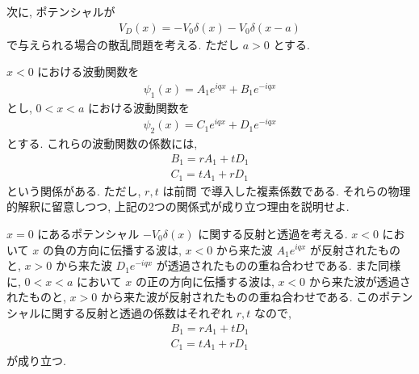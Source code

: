 \documentclass[../../ou-physics-exam.tex]{subfiles}
\begin{document}
次に, ポテンシャルが
\begin{align*}
    V_D (x) = - V_0 \delta (x) - V_0 \delta (x - a)
\end{align*}
で与えられる場合の散乱問題を考える. 
ただし $ a > 0 $ とする.

$ x < 0 $ における波動関数を
\begin{align*}
    \psi_1 (x) = A_1 e^{iqx} + B_1 e^{-iqx}
\end{align*}
とし, $ 0 < x < a $ における波動関数を
\begin{align*}
    \psi_2 (x) = C_1 e^{iqx} + D_1 e^{-iqx}
\end{align*}
とする. 
これらの波動関数の係数には,
\begin{align*}
    B_1 = rA_1 + tD_1 \\
    C_1 = tA_1 + rD_1
\end{align*}
という関係がある. 
ただし, $ r, t $ は前問 \setcounter{prob}{1}  で導入した複素係数である. 
それらの物理的解釈に留意しつつ, 上記の2つの関係式が成り立つ理由を説明せよ.
\begin{answer}
    $ x = 0 $ にあるポテンシャル $ - V_0 \delta (x) $ に関する反射と透過を考える. 
    $ x < 0 $ において $ x $ の負の方向に伝播する波は, $ x < 0 $ から来た波 $ A_1 e^{iqx} $ が反射されたものと, $ x > 0 $ から来た波 $ D_1 e^{-iqx} $ が透過されたものの重ね合わせである. 
    また同様に, $ 0 < x < a $ において $ x $ の正の方向に伝播する波は, $ x < 0 $ から来た波が透過されたものと, $ x > 0 $ から来た波が反射されたものの重ね合わせである. 
    このポテンシャルに関する反射と透過の係数はそれぞれ $ r, t $ なので,
    \begin{align*}
        B_1 = rA_1 + tD_1 \\
        C_1 = tA_1 + rD_1
    \end{align*}
    が成り立つ.
\end{answer}
\end{document}
